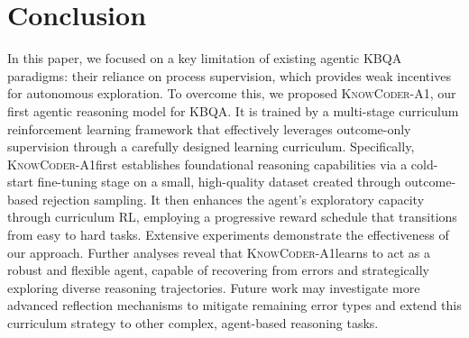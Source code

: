 \documentclass{article} %
\newcommand{\ours}{\textsc{KnowCoder-A1}}
\begin{document}
\section{Conclusion}\label{sec:conclusion} In this paper, we focused on a key limitation of existing agentic KBQA paradigms: their reliance on process supervision, which provides weak incentives for autonomous exploration. To overcome this, we proposed \ours, our first agentic reasoning model for KBQA. It is trained by a multi-stage curriculum reinforcement learning framework that effectively leverages outcome-only supervision through a carefully designed learning curriculum. Specifically, \ours\space first establishes foundational reasoning capabilities via a cold-start fine-tuning stage on a small, high-quality dataset created through outcome-based rejection sampling. It then enhances the agent’s exploratory capacity through curriculum RL, employing a progressive reward schedule that transitions from easy to hard tasks. Extensive experiments demonstrate the effectiveness of our approach. Further analyses reveal that \ours\space learns to act as a robust and flexible agent, capable of recovering from errors and strategically exploring diverse reasoning trajectories. Future work may investigate more advanced reflection mechanisms to mitigate remaining error types and extend this curriculum strategy to other complex, agent-based reasoning tasks.


\end{document}
